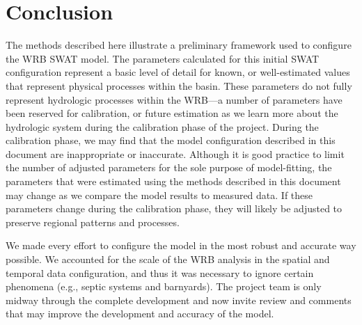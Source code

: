 \section{Conclusion}

The methods described here illustrate a preliminary framework used to configure the WRB SWAT model. The parameters calculated for this initial SWAT configuration represent a basic level of detail for known, or well-estimated values that represent physical processes within the basin. These parameters do not fully represent hydrologic processes within the WRB---a number of parameters have been reserved for calibration, or future estimation as we learn more about the hydrologic system during the calibration phase of the project. During the calibration phase, we may find that the model configuration described in this document are inappropriate or inaccurate. Although it is good practice to limit the number of adjusted parameters for the sole purpose of model-fitting, the parameters that were estimated using the methods described in this document may change as we compare the model results to measured data. If these parameters change during the calibration phase, they will likely be adjusted to preserve regional patterns and processes.

We made every effort to configure the model in the most robust and accurate way possible. We accounted for the scale of the WRB analysis in the spatial and temporal data configuration, and thus it was necessary to ignore certain phenomena (e.g., septic systems and barnyards).
The project team is only midway through the complete development and now invite review and comments that may improve  the development and accuracy of the model. 



\pagebreak